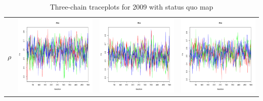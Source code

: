 \documentclass[letter,12pt]{article}
\begin{document}
\begin{table}
\begin{tabular}{cccc}
    $\rho$           & \includegraphics[width=.15\columnwidth]{../graphs/traceplots/2009d0v_7.pdf} &
                        \includegraphics[width=.15\columnwidth]{../graphs/traceplots/2009d0vbar_7.pdf} &
                         \includegraphics[width=.15\columnwidth]{../graphs/traceplots/2009d0wbar_7.pdf} \\
\end{tabular}
\caption{Three-chain traceplots for 2009 with status quo map}
\end{table}
\end{document}
